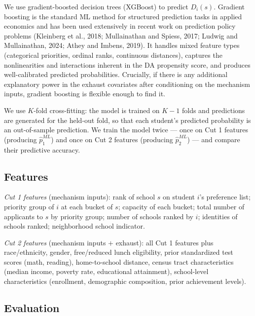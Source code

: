 \documentclass[12pt,a4paper,dvipsnames]{article}
\begin{document}
We use gradient-boosted decision trees (XGBoost) to predict $D_i(s)$. Gradient boosting is the standard ML method for structured prediction tasks in applied economics and has been used extensively in recent work on prediction policy problems (Kleinberg et al., 2018; Mullainathan and Spiess, 2017; Ludwig and Mullainathan, 2024; Athey and Imbens, 2019). It handles mixed feature types (categorical priorities, ordinal ranks, continuous distances), captures the nonlinearities and interactions inherent in the DA propensity score, and produces well-calibrated predicted probabilities. Crucially, if there is any additional explanatory power in the exhaust covariates after conditioning on the mechanism inputs, gradient boosting is flexible enough to find it.

We use $K$-fold cross-fitting: the model is trained on $K-1$ folds and predictions are generated for the held-out fold, so that each student's predicted probability is an out-of-sample prediction. We train the model twice --- once on Cut 1 features (producing $\hat{p}^{ML}_1$) and once on Cut 2 features (producing $\hat{p}^{ML}_2$) --- and compare their predictive accuracy.

\subsection{Features}

\textit{Cut 1 features} (mechanism inputs): rank of school $s$ on student $i$'s preference list; priority group of $i$ at each bucket of $s$; capacity of each bucket; total number of applicants to $s$ by priority group; number of schools ranked by $i$; identities of schools ranked; neighborhood school indicator.

\textit{Cut 2 features} (mechanism inputs $+$ exhaust): all Cut 1 features plus race/ethnicity, gender, free/reduced lunch eligibility, prior standardized test scores (math, reading), home-to-school distance, census tract characteristics (median income, poverty rate, educational attainment), school-level characteristics (enrollment, demographic composition, prior achievement levels).

\subsection{Evaluation}
\end{document}
